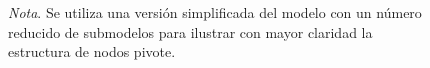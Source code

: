 \begin{figure}[H]
    \caption{Nodos pivotes de renderizables de un modelo}
    \centering
    \caption*{\textit{Nota}. \textnormal{Se utiliza una versión simplificada del modelo con un número reducido de submodelos para ilustrar con mayor claridad la estructura de nodos pivote.}}
    \label{fig:node_pivots}
\end{figure}
